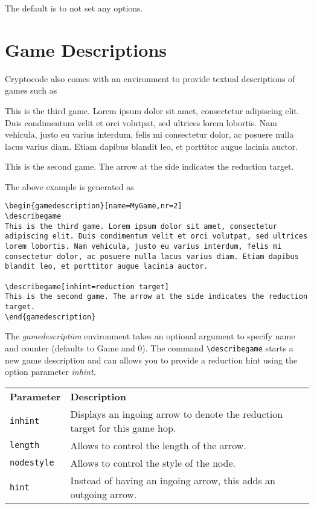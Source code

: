 \documentclass[a4paper]{report}
\begin{document}
The default is to not set any options.

\section{Game Descriptions}
Cryptocode also comes with an environment to provide textual descriptions of games such as


 \begin{gamedescription}[name=MyGame,nr=2]
\describegame
 This is the third game. Lorem ipsum dolor sit amet, consectetur adipiscing elit. Duis condimentum velit et orci volutpat, sed ultrices lorem lobortis. Nam vehicula, justo eu varius interdum, felis mi consectetur dolor, ac posuere nulla lacus varius diam. Etiam dapibus blandit leo, et porttitor augue lacinia auctor.

\describegame[inhint=reduction target]
 This is the second game. The arrow at the side indicates the reduction target.
 \end{gamedescription}
 
 The above example is generated as
 
\begin{lstlisting}
\begin{gamedescription}[name=MyGame,nr=2]
\describegame
This is the third game. Lorem ipsum dolor sit amet, consectetur adipiscing elit. Duis condimentum velit et orci volutpat, sed ultrices lorem lobortis. Nam vehicula, justo eu varius interdum, felis mi consectetur dolor, ac posuere nulla lacus varius diam. Etiam dapibus blandit leo, et porttitor augue lacinia auctor.

\describegame[inhint=reduction target]
This is the second game. The arrow at the side indicates the reduction target.
\end{gamedescription}
\end{lstlisting}

The \emph{gamedescription} environment takes an optional argument to specify name and counter (defaults to Game and 0). The command 
\lstinline$\describegame$ starts a new game description and can allows you to provide a reduction hint using the option parameter \emph{inhint}.

\begin{center}
\begin{tabular}{ll}
\textbf{Parameter} & \textbf{Description} \\
\lstinline$inhint$ & Displays an ingoing arrow to denote the reduction target for this game hop.\\
\lstinline$length$ & Allows to control the length of the arrow. \\
\lstinline$nodestyle$ & Allows to control the style of the node. \\
\lstinline$hint$ &  Instead of having an ingoing arrow, this adds an outgoing arrow. \\
\end{tabular}
\end{center}
\end{document}
